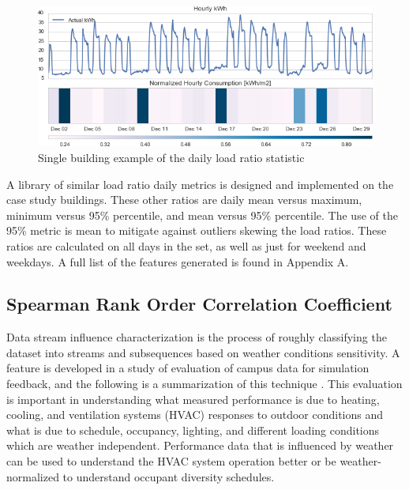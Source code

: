 \begin{figure}[ht!]
\begin{center}
\includegraphics[width=1\columnwidth]{figures/loadratio_example/loadratio_example}
\caption{Single building example of the daily load ratio statistic
\label{fig:loadratio_singlebuilding}%
}
\end{center}
\end{figure}



A library of similar load ratio daily metrics is designed and implemented on the case study buildings. These other ratios are daily mean versus maximum, minimum versus 95\% percentile, and mean versus 95\% percentile. The use of the 95\% metric is mean to mitigate against outliers skewing the load ratios. These ratios are calculated on all days in the set, as well as just for weekend and weekdays. A full list of the features generated is found in Appendix A.

\subsection{Spearman Rank Order Correlation Coefficient}
\label{sec:weathercorrelationcoeff}

Data stream influence characterization is the process of roughly classifying the dataset into streams and subsequences based on weather conditions sensitivity. A feature is developed in a study of evaluation of campus data for simulation feedback, and the following is a summarization of this technique \citep{miller_forensically_2015}. This evaluation is important in understanding what measured performance is due to heating, cooling, and ventilation systems (HVAC) responses to outdoor conditions and what is due to schedule, occupancy, lighting, and different loading conditions which are weather independent. Performance data that is influenced by weather can be used to understand the HVAC system operation better or be weather-normalized to understand occupant diversity schedules. %

